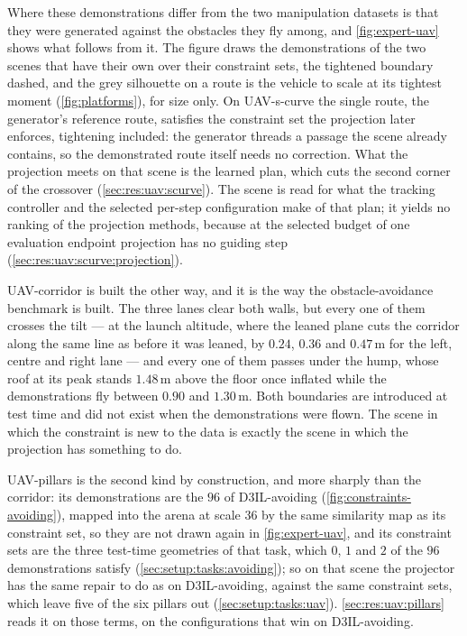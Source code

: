 Where these demonstrations differ from the two manipulation datasets is that they were generated against
the obstacles they fly among, and \autoref{fig:expert-uav} shows what follows from it. The figure draws
the demonstrations of the two scenes that have their own over their constraint sets, the tightened boundary dashed, and the grey silhouette
on a route is the vehicle to scale at its tightest moment (\autoref{fig:platforms}), for size only. On
UAV-s-curve the
single route, the generator's reference route, satisfies the constraint set the projection later enforces,
tightening included: the generator threads a passage the scene already contains, so the demonstrated
route itself needs no correction. What the projection meets on that scene is the learned plan, which cuts
the second corner of the crossover (\autoref{sec:res:uav:scurve}). The scene is read for what the tracking
controller and the selected per-step configuration make of that plan; it yields no ranking of the
projection methods, because at the selected budget of one evaluation endpoint projection has no guiding
step (\autoref{sec:res:uav:scurve:projection}).

UAV-corridor is built the other way, and it is the way the obstacle-avoidance benchmark is built. The three
lanes clear both walls, but every one of them crosses the tilt --- at the launch altitude, where the leaned
plane cuts the corridor along the same line as before it was leaned, by $0.24$, $0.36$ and $0.47$\,m for the
left, centre and right lane --- and every one of them passes under the hump, whose roof at its peak stands
$1.48$\,m above the floor once inflated while the demonstrations fly between $0.90$ and $1.30$\,m. Both
boundaries are introduced at test time and did not exist when the demonstrations were flown. The scene in
which the constraint is new to the data is exactly the scene in which the projection has something to do.


UAV-pillars is the second kind by construction, and more sharply than the corridor: its demonstrations are
the $96$ of D3IL-avoiding (\autoref{fig:constraints-avoiding}), mapped into the arena at scale $36$ by the
same similarity map as its constraint set, so they are not drawn again in \autoref{fig:expert-uav}, and
its constraint sets are the three test-time geometries of
that task, which $0$, $1$ and $2$ of the $96$ demonstrations satisfy (\autoref{sec:setup:tasks:avoiding});
so on that scene the projector has the same repair to do as on D3IL-avoiding, against the same constraint
sets, which leave five of the six pillars out (\autoref{sec:setup:tasks:uav}).
\autoref{sec:res:uav:pillars} reads it on those terms, on the configurations that win on D3IL-avoiding.

